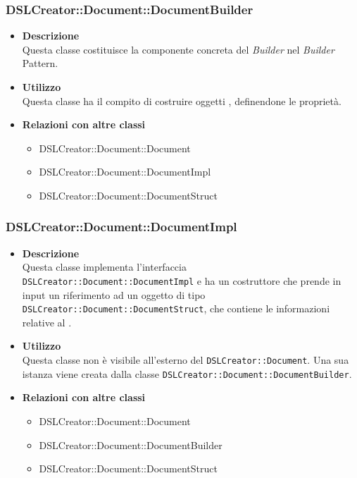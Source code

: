  \subsubsection{DSLCreator::Document::DocumentBuilder}
                    \begin{itemize}
                        \item \textbf{Descrizione} \hfill \\
                            Questa classe costituisce la componente concreta del \textit{Builder} nel \textit{Builder} Pattern.
                        \item \textbf{Utilizzo} \hfill \\
                            Questa classe ha il compito di costruire oggetti , definendone le proprietà.
                        \item \textbf{Relazioni con altre classi}
                            \begin{itemize}
                              \item DSLCreator::Document::Document
                              \item DSLCreator::Document::DocumentImpl
                              \item DSLCreator::Document::DocumentStruct
                            \end{itemize}
                    \end{itemize}

 \subsubsection{DSLCreator::Document::DocumentImpl}
                    \begin{itemize}
                        \item \textbf{Descrizione} \hfill \\
                            Questa classe implementa l'interfaccia \texttt{DSLCreator::Document::DocumentImpl} e ha un costruttore che prende in input un riferimento ad un oggetto di tipo \texttt{DSLCrea\-tor::Document::DocumentStruct}, che contiene le informazioni relative al .
                        \item \textbf{Utilizzo} \hfill \\
                            Questa classe non è visibile all'esterno del  \texttt{DSLCreator::Document}. Una sua istanza viene creata dalla classe \texttt{DSLCreator::Document::DocumentBuilder}.
                        \item \textbf{Relazioni con altre classi}
                            \begin{itemize}
                              \item DSLCreator::Document::Document
                              \item DSLCreator::Document::DocumentBuilder
                              \item DSLCreator::Document::DocumentStruct
                            \end{itemize}
                    \end{itemize}

